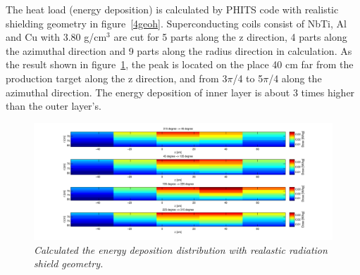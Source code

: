 The heat load (energy deposition) is calculated by PHITS code with realistic shielding geometry in figure~\ref{4geoh}.
Superconducting coils consist of NbTi, Al and Cu with 3.80 g/cm$^3$ are cut for 5 parts along the z direction, 4 parts along the azimuthal direction and 9 parts along the radius direction in calculation.
As the result shown in figure~\ref{4heat}, the peak is located on the place 40 cm far from the production target along the z direction, and from 3$\pi$/4 to 5$\pi$/4 along the azimuthal direction.
The energy deposition of inner layer is about 3 times higher than the outer layer's.
 \begin{figure}[H]
  \centering
  \includegraphics[scale=0.62]{chapter5/fig/HRS.pdf}
  \caption{\it Calculated the energy deposition distribution with realastic radiation shield geometry.}
  \label{4heat}
 \end{figure}

